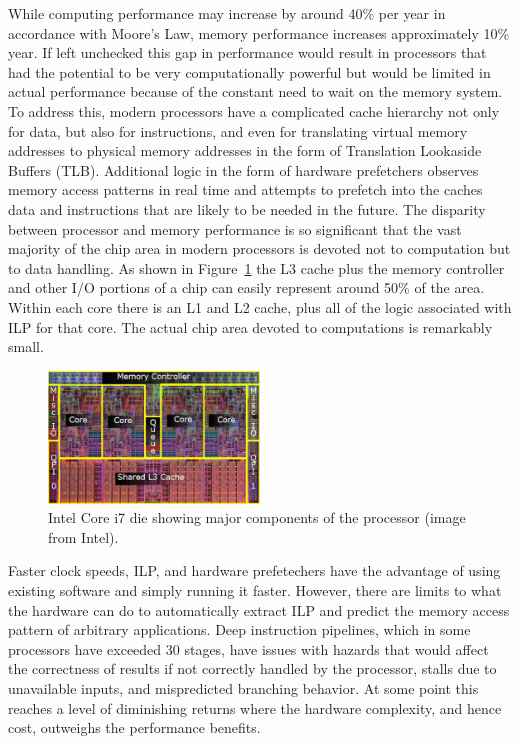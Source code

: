 \documentclass{JINST}
\begin{document}
While computing performance may increase by around 40\% per year in accordance with Moore's Law, memory performance increases approximately 10\% year.  If left unchecked this gap in performance would result in processors that had the potential to be very computationally powerful but would be limited in actual performance because of the constant need to wait on the memory system.  To address this, modern processors have a complicated cache hierarchy not only for data, but also for instructions, and even for translating virtual memory addresses to physical memory addresses in the form of Translation Lookaside Buffers (TLB).  Additional logic in the form of hardware prefetchers observes memory access patterns in real time and attempts to prefetch into the caches data and instructions that are likely to be needed in the future.  The disparity between processor and memory performance is so significant that the vast majority of the chip area in modern processors is devoted not to computation but to data handling.  As shown in Figure~\ref{fig:core_i7_die} the L3 cache plus the memory controller and other I/O portions of a chip can easily represent around 50\% of the area.  Within each core there is an L1 and L2 cache, plus all of the logic associated with ILP for that core.  The actual chip area devoted to computations is remarkably small.

\begin{figure}[!Hhtb]
\begin{center}
\includegraphics[width=0.5\textwidth]{figs/Core_i7_die.pdf}
\caption{Intel Core i7 die showing major components of the processor (image from Intel). \label{fig:core_i7_die}}
\end{center}
\end{figure}

Faster clock speeds, ILP, and hardware prefetechers have the advantage of using existing software and simply running it faster.  However, there are limits to what the hardware can do to automatically extract ILP and predict the memory access pattern of arbitrary applications.  Deep instruction pipelines, which in some processors have exceeded 30 stages, have issues with hazards that would affect the correctness of results if not correctly handled by the processor, stalls due to unavailable inputs, and mispredicted branching behavior.  At some point this reaches a level of diminishing returns where the hardware complexity, and hence cost, outweighs the performance benefits.
\end{document}
